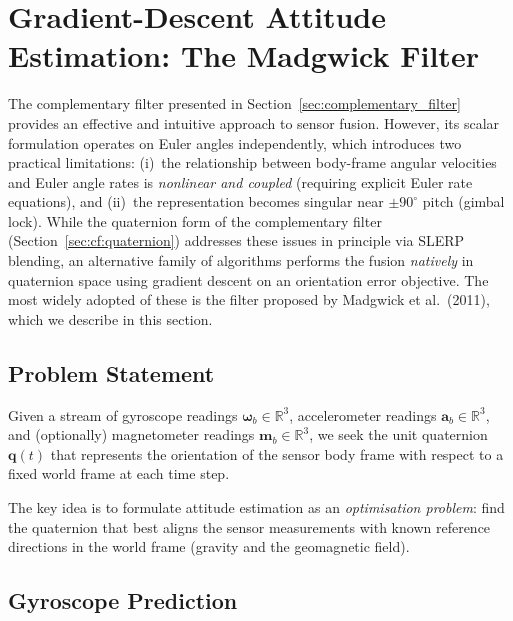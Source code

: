 \section{Gradient-Descent Attitude Estimation: The Madgwick Filter}
\label{sec:madgwick}


The complementary filter presented in Section~\ref{sec:complementary_filter}
provides an effective and intuitive approach to sensor fusion.  However, its
scalar formulation operates on Euler angles independently, which introduces
two practical limitations: (i)~the relationship between body-frame angular
velocities and Euler angle rates is \emph{nonlinear and coupled} (requiring
explicit Euler rate equations), and (ii)~the representation becomes singular
near $\pm 90^\circ$ pitch (gimbal lock).  While the quaternion form of the
complementary filter (Section~\ref{sec:cf:quaternion}) addresses these issues
in principle via SLERP blending, an alternative family of algorithms performs
the fusion \emph{natively} in quaternion space using gradient descent on an
orientation error objective.  The most widely adopted of these is the filter
proposed by Madgwick et al.~(2011), which we describe in this section.

\subsection{Problem Statement}
\label{sec:madg:problem}

Given a stream of gyroscope readings
$\boldsymbol{\omega}_b \in \mathbb{R}^3$, accelerometer readings
$\mathbf{a}_b \in \mathbb{R}^3$, and (optionally) magnetometer readings
$\mathbf{m}_b \in \mathbb{R}^3$, we seek the unit quaternion
$\mathbf{q}(t)$ that represents the orientation of the sensor body frame
with respect to a fixed world frame at each time step.

The key idea is to formulate attitude estimation as an \emph{optimisation
problem}: find the quaternion that best aligns the sensor measurements with
known reference directions in the world frame (gravity and the geomagnetic
field).

\subsection{Gyroscope Prediction}
\label{sec:madg:gyro}

